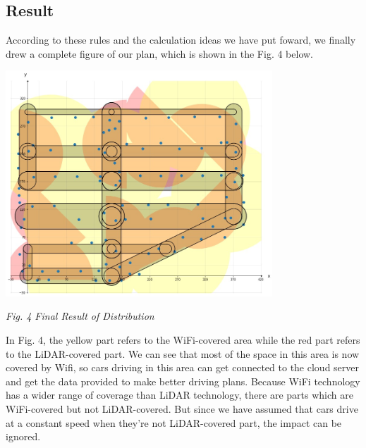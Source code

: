 \documentclass[12pt]{article}
\theoremstyle{definition}
\theoremstyle{remark}
\numberwithin{equation}{section}
\begin{document}
	\newpage
	\subsection{Result}
	According to these rules and the calculation ideas we have put foward, we finally drew a complete figure of our plan, which is shown in the Fig. 4 below.
	\begin{center}
		\includegraphics[width=10cm]{final.jpg}
		
		\small\textit{Fig. 4 Final Result of Distribution}
	\end{center}

	In Fig. 4, the yellow part refers to the WiFi-covered area while the red part refers to the LiDAR-covered part. We can see that most of the space in this area is now covered by Wifi, so cars driving in this area can get connected to the cloud server and get the data provided to make better driving plans. Because WiFi technology has a wider range of coverage than LiDAR technology, there are parts which are WiFi-covered but not LiDAR-covered. But since we have assumed that cars drive at a constant speed when they're not LiDAR-covered part, the impact can be ignored.
	
\end{document}
